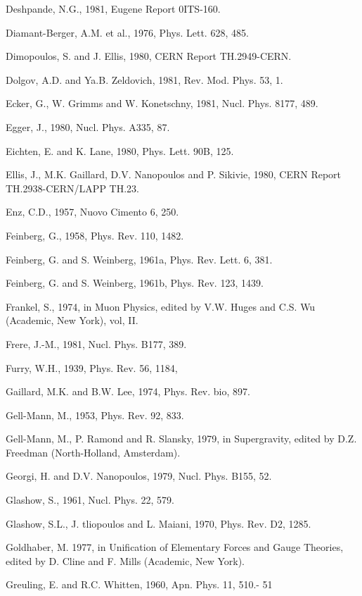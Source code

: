 \documentclass[twoside]{article}
\begin{document}
{{{{{{{{{{{{{{{{\begin{thebibliography}{10}
\bibitem{}
Deshpande, N.G., 1981, Eugene Report 0ITS-160.

\bibitem{}
Diamant-Berger, A.M. et al., 1976, Phys. Lett. 628, 485.

\bibitem{}
Dimopoulos, S. and J. Ellis, 1980, CERN Report TH.2949-CERN.

\bibitem{}
Dolgov, A.D. and Ya.B. Zeldovich, 1981, Rev. Mod. Phys. 53, 1.

\bibitem{}
Ecker, G., W. Grimms and W. Konetschny, 1981, Nucl. Phys. 8177, 489.

\bibitem{}
Egger, J., 1980, Nucl. Phys. A335, 87.

\bibitem{}
Eichten, E. and K. Lane, 1980, Phys. Lett. 90B, 125.

\bibitem{}
Ellis, J., M.K. Gaillard, D.V. Nanopoulos and P. Sikivie, 1980, CERN Report TH.2938-CERN/LAPP TH.23.

\bibitem{}
Enz, C.D., 1957, Nuovo Cimento 6, 250.

\bibitem{}
Feinberg, G., 1958, Phys. Rev. 110, 1482.

\bibitem{}
Feinberg, G. and S. Weinberg, 1961a, Phys. Rev. Lett. 6, 381.

\bibitem{}
Feinberg, G. and S. Weinberg, 1961b, Phys. Rev. 123, 1439.

\bibitem{}
Frankel, S., 1974, in Muon Physics, edited by V.W. Huges and C.S. Wu (Academic, New York), vol, II.

\bibitem{}
Frere, J.-M., 1981, Nucl. Phys. B177, 389.

\bibitem{}
Furry, W.H., 1939, Phys. Rev. 56, 1184,

\bibitem{}
Gaillard, M.K. and B.W. Lee, 1974, Phys. Rev. bio, 897.

\bibitem{}
Gell-Mann, M., 1953, Phys. Rev. 92, 833.

\bibitem{}
Gell-Mann, M., P. Ramond and R. Slansky, 1979, in Supergravity, edited by D.Z. Freedman (North-Holland, Amsterdam).

\bibitem{}
Georgi, H. and D.V. Nanopoulos, 1979, Nucl. Phys. B155, 52.

\bibitem{}
Glashow, S., 1961, Nucl. Phys. 22, 579.

\bibitem{}
Glashow, S.L., J. tliopoulos and L. Maiani, 1970, Phys. Rev. D2, 1285.

\bibitem{}
Goldhaber, M. 1977, in Unification of Elementary Forces and Gauge Theories, edited by D. Cline and F. Mills (Academic, New York).

\bibitem{}
Greuling, E. and R.C. Whitten, 1960, Apn. Phys. 11, 510.- 51 ~


\end{thebibliography}}}}}}}}}}}}}}}}}
\end{document}
